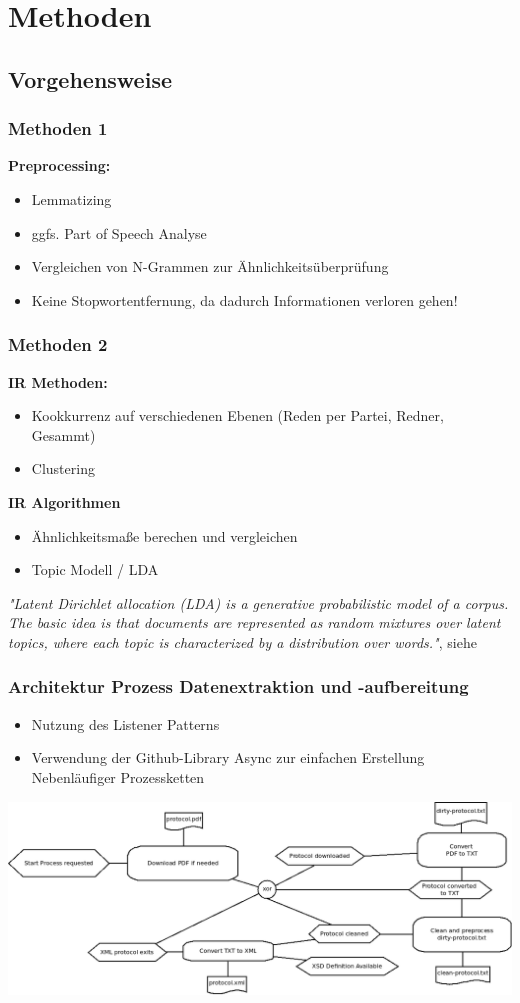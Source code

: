 \documentclass[11pt, a4paper]{beamer}
\begin{document}
\section{Methoden}
\subsection{Vorgehensweise}
\begin{frame}
\frametitle{Methoden 1}
\textbf{Preprocessing:}
\begin{itemize}
\item Lemmatizing
\item ggfs. Part of Speech Analyse  
\item Vergleichen von N-Grammen zur Ähnlichkeitsüberprüfung
\item Keine Stopwortentfernung, da dadurch Informationen verloren gehen!
\end{itemize}
\end{frame}

\begin{frame}
\frametitle{Methoden 2}
\textbf{IR Methoden:}
\begin{itemize}
\item Kookkurrenz auf verschiedenen Ebenen (Reden per Partei, Redner, Gesammt)
\item Clustering
\end{itemize}
\textbf{IR Algorithmen}
\begin{itemize}
\item Ähnlichkeitsmaße berechen und vergleichen 
\item Topic Modell / LDA 
\end{itemize}
\textit {"Latent Dirichlet allocation (LDA) is a generative probabilistic
	model of a corpus. The basic idea is that documents are represented as
 	random mixtures over latent topics, where each topic is characterized by a
 	distribution over words."}, siehe \cite{blatent}
%  	
\end{frame} 

\begin{frame}
  \frametitle{Architektur Prozess Datenextraktion und -aufbereitung }
  \begin{itemize}
  \item Nutzung des Listener Patterns \cite{javainsel9}
  \item Verwendung der Github-Library Async \cite{async} zur einfachen Erstellung Nebenläufiger Prozessketten
  \end{itemize}  
  \begin{center}
    \includegraphics[width=1\textwidth]{../../doc/process-overview.png}
  \end{center}
\end{frame}
\end{document}
